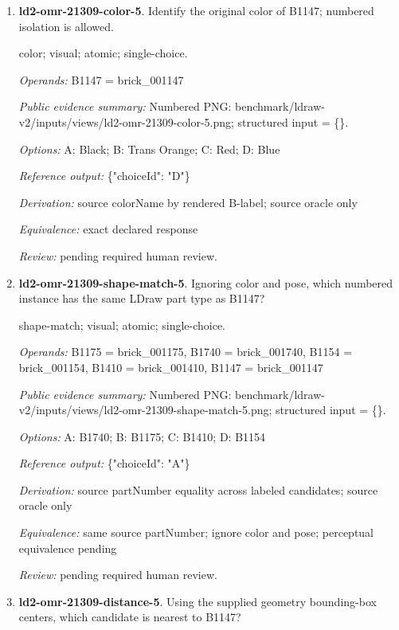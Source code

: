 \begin{enumerate}
\item \textbf{ld2-omr-21309-color-5}. Identify the original color of B1147; numbered isolation is allowed.
\par{\small color; visual; atomic; single-choice.\par\textit{Operands:} B1147 = brick\_001147\par\textit{Public evidence summary:} Numbered PNG: benchmark/ldraw-v2/inputs/views/ld2-omr-21309-color-5.png; structured input = \{\}.\par\textit{Options:} A: Black; B: Trans Orange; C: Red; D: Blue\par\textit{Reference output:} \{"choiceId": "D"\}\par\textit{Derivation:} source colorName by rendered B-label; source oracle only\par\textit{Equivalence:} exact declared response\par\textit{Review:} pending required human review.}
\item \textbf{ld2-omr-21309-shape-match-5}. Ignoring color and pose, which numbered instance has the same LDraw part type as B1147?
\par{\small shape-match; visual; atomic; single-choice.\par\textit{Operands:} B1175 = brick\_001175, B1740 = brick\_001740, B1154 = brick\_001154, B1410 = brick\_001410, B1147 = brick\_001147\par\textit{Public evidence summary:} Numbered PNG: benchmark/ldraw-v2/inputs/views/ld2-omr-21309-shape-match-5.png; structured input = \{\}.\par\textit{Options:} A: B1740; B: B1175; C: B1410; D: B1154\par\textit{Reference output:} \{"choiceId": "A"\}\par\textit{Derivation:} source partNumber equality across labeled candidates; source oracle only\par\textit{Equivalence:} same source partNumber; ignore color and pose; perceptual equivalence pending\par\textit{Review:} pending required human review.}
\item \textbf{ld2-omr-21309-distance-5}. Using the supplied geometry bounding-box centers, which candidate is nearest to B1147?

\end{enumerate}
